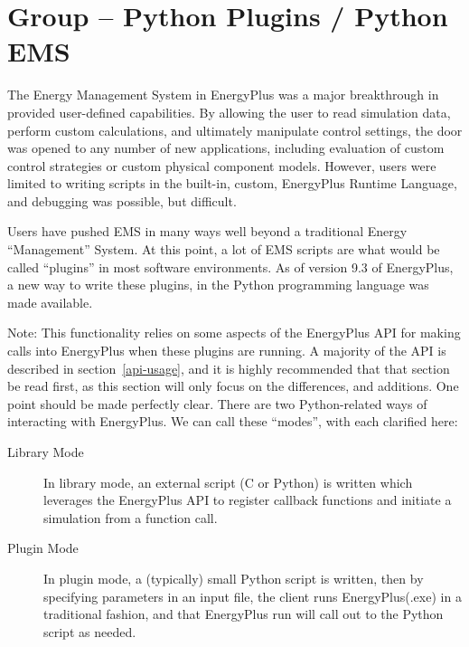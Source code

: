 \section{Group -- Python Plugins / Python EMS}\label{group-python-plugins}

The Energy Management System in EnergyPlus was a major breakthrough in provided user-defined capabilities.
By allowing the user to read simulation data, perform custom calculations, and ultimately manipulate control settings, the door was opened to any number of new applications, including evaluation of custom control strategies or custom physical component models.
However, users were limited to writing scripts in the built-in, custom, EnergyPlus Runtime Language, and debugging was possible, but difficult.

Users have pushed EMS in many ways well beyond a traditional Energy ``Management'' System.
At this point, a lot of EMS scripts are what would be called ``plugins'' in most software environments.
As of version 9.3 of EnergyPlus, a new way to write these plugins, in the Python programming language was made available.

Note: This functionality relies on some aspects of the EnergyPlus API for making calls into EnergyPlus when these plugins are running.
A majority of the API is described in section~\ref{api-usage}, and it is highly recommended that that section be read first, as this section will only focus on the differences, and additions.
One point should be made perfectly clear.
There are two Python-related ways of interacting with EnergyPlus.
We can call these ``modes'', with each clarified here:

\begin{description}
    \item[Library Mode] In library mode, an external script (C or Python) is written which leverages the EnergyPlus API to register callback functions and initiate a simulation from a function call.
    \item[Plugin Mode] In plugin mode, a (typically) small Python script is written, then by specifying parameters in an input file, the client runs EnergyPlus(.exe) in a traditional fashion, and that EnergyPlus run will call out to the Python script as needed.
\end{description}

